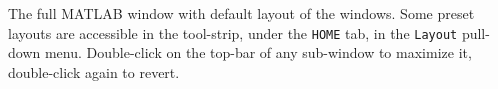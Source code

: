 \label{fig:MatlabFullScreen} The full MATLAB window with default layout of the windows. 
Some preset layouts are accessible in the tool-strip, under the \lstinline{HOME} tab, in the \lstinline{Layout} pull-down menu.
Double-click on the top-bar of any sub-window to maximize it, double-click again to revert.